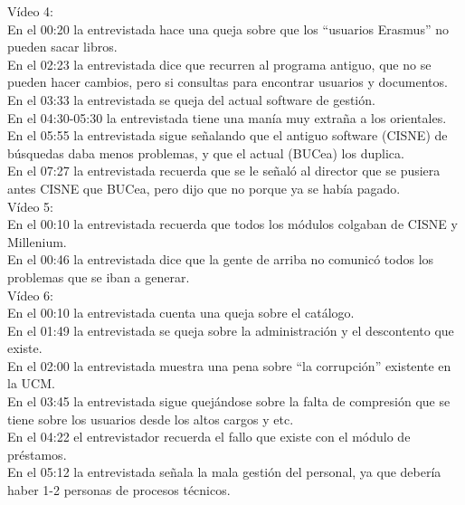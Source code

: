 \documentclass[12pt]{article}
\begin{document}
Vídeo 4: \\
En el 00:20 la entrevistada hace una queja sobre que los “usuarios Erasmus” no pueden sacar libros. \\
En el 02:23 la entrevistada dice que recurren al programa antiguo, que no se pueden hacer cambios, pero si consultas para encontrar usuarios y documentos.\\
En el 03:33 la entrevistada se queja del actual software de gestión.\\
En el 04:30-05:30 la entrevistada tiene una manía muy extraña a los orientales.\\
En el 05:55 la entrevistada sigue señalando que el antiguo software (CISNE) de búsquedas daba menos problemas, y que el actual (BUCea) los duplica.\\
En el 07:27 la entrevistada recuerda que se le señaló al director que se pusiera antes CISNE que BUCea, pero dijo que no porque ya se había pagado.\\

Vídeo 5:\\
En el 00:10 la entrevistada recuerda que todos los módulos colgaban de CISNE y Millenium.\\
En el 00:46 la entrevistada dice que la gente de arriba no comunicó todos los problemas que se iban a generar.\\

Vídeo 6:\\
En el 00:10 la entrevistada cuenta una queja sobre el catálogo. \\
En el 01:49 la entrevistada se queja sobre la administración y el descontento que existe.\\
En el 02:00 la entrevistada muestra una pena sobre “la corrupción” existente en la UCM.\\
En el 03:45 la entrevistada sigue quejándose sobre la falta de compresión que se tiene sobre los usuarios desde los altos cargos y etc.\\
En el 04:22 el entrevistador recuerda el fallo que existe con el módulo de préstamos.\\
En el 05:12 la entrevistada señala la mala gestión del personal, ya que debería haber 1-2 personas de procesos técnicos.\\
\end{document}
